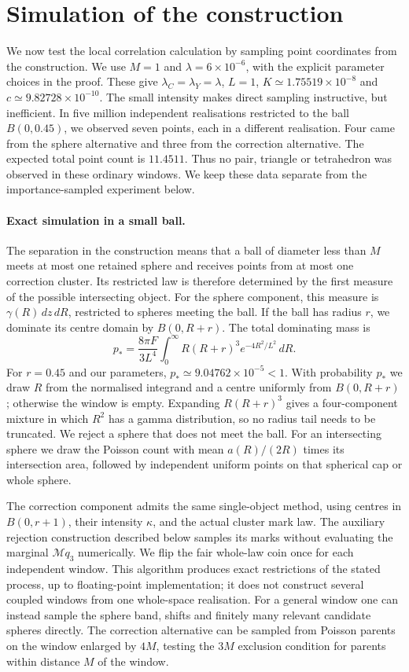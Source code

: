 \providecommand{\simulationdir}{coder}
\section{Simulation of the construction}
\label{sec:simulation}

We now test the local correlation calculation by sampling point coordinates
from the construction. We use $M=1$ and $\lambda=6\times10^{-6}$, with the
explicit parameter choices in the proof. These give
$\lambda_C=\lambda_Y=\lambda$, $L=1$,
$K\simeq1.75519\times10^{-8}$ and $c\simeq9.82728\times10^{-10}$.
The small intensity makes direct sampling instructive, but inefficient.
In five million independent realisations restricted to the ball $B(0,0.45)$,
we observed seven points, each in a different realisation. Four came from
the sphere alternative and three from the correction alternative. The
expected total point count is $11.4511$. Thus no pair, triangle or tetrahedron
was observed in these ordinary windows. We keep these data separate from
the importance-sampled experiment below.

\paragraph{Exact simulation in a small ball.}
The separation in the construction means that a ball of diameter less than
$M$ meets at most one retained sphere and receives points from at most one
correction cluster. Its restricted law is therefore determined by the
first measure of the possible intersecting object. For the sphere component,
this measure is $\gamma(R)\,dz\,dR$, restricted to spheres meeting the ball.
If the ball has radius $r$, we dominate its centre domain by $B(0,R+r)$.
The total dominating mass is
\[
 p_* = \frac{8\pi F}{3L^4}
        \int_0^\infty R(R+r)^3 e^{-4R^2/L^2}\,dR.
\]
For $r=0.45$ and our parameters, $p_*\simeq9.04762\times10^{-5}<1$.
With probability $p_*$ we draw $R$ from the normalised integrand and a
centre uniformly from $B(0,R+r)$; otherwise the window is empty. Expanding
$R(R+r)^3$ gives a four-component mixture in which $R^2$ has a gamma
distribution, so no radius tail needs to be truncated. We reject a sphere
that does not meet the ball. For an intersecting sphere we draw the
Poisson count with mean $a(R)/(2R)$ times its intersection area, followed
by independent uniform points on that spherical cap or whole sphere.

The correction component admits the same single-object method, using
centres in $B(0,r+1)$, their intensity $\kappa$, and the actual cluster
mark law. The auxiliary rejection construction described below samples its
marks without evaluating the marginal $\mathcal Mq_3$ numerically.
We flip the fair whole-law coin once for each independent window. This
algorithm produces exact restrictions of the stated process, up to
floating-point implementation; it does not construct several coupled
windows from one whole-space realisation. For a general window one can
instead sample the sphere band, shifts and finitely many relevant candidate
spheres directly. The correction alternative can be sampled from Poisson
parents on the window enlarged by $4M$, testing the $3M$ exclusion condition
for parents within distance $M$ of the window.


